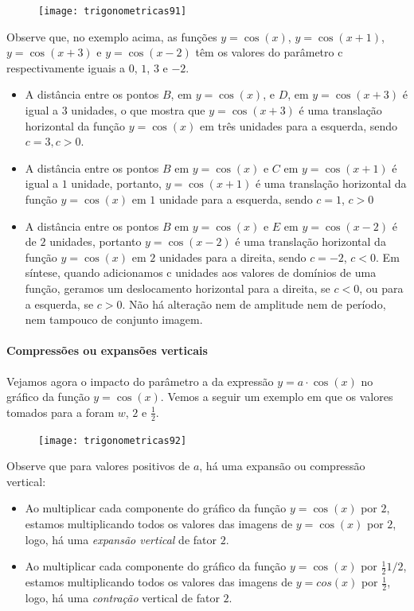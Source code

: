 \begin{figure}[H]
\centering

\texttt{[image: trigonometricas91]}
\end{figure}

Observe que, no exemplo acima, as funções $y=\cos(x)$, $y=\cos(x+1)$, $y=\cos(x+3)$ e $y=\cos(x-2)$ têm os valores do parâmetro c respectivamente iguais a $0$, $1$, $3$ e $-2$.

\begin{itemize}
\item A distância entre os pontos $B$, em $y=\cos(x)$, e $D$, em $y=\cos(x+3)$ é igual a $3$ unidades, o que mostra que $y=\cos(x+3)$ é uma translação horizontal da função $y=\cos(x)$ em três unidades para a esquerda, sendo $c=3, c > 0$.
\item A distância entre os pontos $B$ em $y=\cos(x)$ e $C$ em $y=\cos(x+1)$ é igual a $1$ unidade, portanto, $y=\cos(x+1)$ é uma translação horizontal da função $y=\cos(x)$ em $1$ unidade para a esquerda, sendo $c=1$, $c > 0$
\item A distância entre os pontos $B$ em $y=\cos(x)$ e $E$ em $y=\cos(x-2)$ é de $2$ unidades, portanto $y=\cos(x-2)$ é uma translação horizontal da função $y=\cos(x)$ em $2$ unidades para a direita, sendo $c = -2$, $c < 0$.
Em síntese, quando adicionamos c unidades aos valores de domínios de uma função, geramos um deslocamento horizontal para a direita, se $c < 0$, ou para a esquerda, se $c > 0$.  Não há alteração nem de amplitude nem de período, nem tampouco de conjunto imagem.
\end{itemize}

\paragraph{Compressões ou expansões verticais}

Vejamos agora o impacto do parâmetro a da expressão $y=a\cdot\cos(x)$ no gráfico da função $y = \cos(x)$. Vemos a seguir um exemplo em que os valores tomados para a foram $w$, $2$ e $\frac{1}{2}$.

\begin{figure}[H]
\centering

\texttt{[image: trigonometricas92]}
\end{figure}

Observe que para valores positivos de $a$, há uma expansão ou compressão vertical:

\begin{itemize}
\item Ao multiplicar cada componente do gráfico da função $y=\cos(x)$ por $2$, estamos multiplicando todos os valores das imagens de $y=\cos(x)$ por $2$, logo, há uma \textit{expansão vertical} de fator $2$.

\item Ao multiplicar cada componente do gráfico da função $y=\cos(x)$ por $\frac{1}{2}$$1/2$, estamos multiplicando todos os valores das imagens de $y=cos(x)$ por $\frac{1}{2}$, logo,	há uma \textit{contração} vertical de fator $2$.
\end{itemize}

